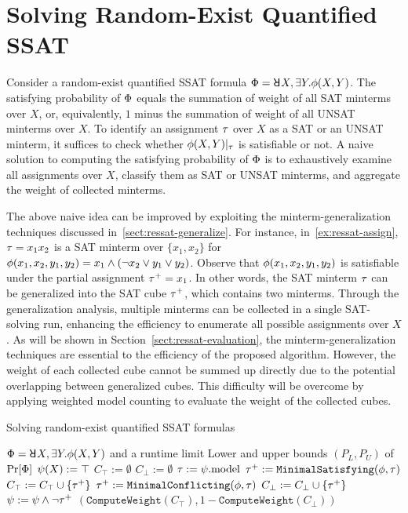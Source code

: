 \section{Solving Random-Exist Quantified SSAT}
\label{sect:ressat-technique}

Consider a random-exist quantified SSAT formula $\Qf=\random{} X,\exists Y.\pf(X,Y)$.
The satisfying probability of $\Phi$ equals the summation of weight of all SAT minterms over $X$, or, equivalently,
$1$ minus the summation of weight of all UNSAT minterms over $X$.
To identify an assignment $\tau$ over $X$ as a SAT or an UNSAT minterm,
it suffices to check whether $\phi(X,Y)|_{\tau}$ is satisfiable or not.
A naive solution to computing the satisfying probability of $\Phi$ is to exhaustively examine all assignments over $X$, classify them as SAT or UNSAT minterms, and aggregate the weight of collected minterms.

The above naive idea can be improved by exploiting the minterm-generalization techniques discussed in~\cref{sect:ressat-generalize}.
For instance, in~\cref{ex:ressat-assign},
$\tau=x_1x_2$ is a SAT minterm over $\{x_1,x_2\}$ for $\phi(x_1,x_2,y_1,y_2)=x_1 \land (\lnot x_2 \lor y_1 \lor y_2)$.
Observe that $\phi(x_1,x_2,y_1,y_2)$ is satisfiable under the partial assignment $\tau^+=x_1$.
In other words, the SAT minterm $\tau$ can be generalized into the SAT cube $\tau^+$, which contains two minterms.
Through the generalization analysis, multiple minterms can be collected in a single SAT-solving run,
enhancing the efficiency to enumerate all possible assignments over $X$.
As will be shown in Section~\ref{sect:ressat-evaluation},
the minterm-generalization techniques are essential to the efficiency of the proposed algorithm.
However, the weight of each collected cube cannot be summed up directly due to the potential overlapping between generalized cubes.
This difficulty will be overcome by applying weighted model counting to evaluate the weight of the collected cubes.

\begin{algorithm}[p]
    \caption{Solving random-exist quantified SSAT formulas}
    \label{alg:ressat}
    \begin{algorithmic}[1]
        \REQUIRE
        $\Qf=\random{} X,\exists Y.\pf(X,Y)$ and a runtime limit \timeout
        \ENSURE
        Lower and upper bounds $(P_L,P_U)$ of $\Pr[\Phi]$
        \STATE $\psi(X) := \top$
        \STATE $C_\top := \emptyset$
        \STATE $C_\bot := \emptyset$
        \STATE $\tau := \psi.\mathrm{model}$
        \IF{($\sat{\pcf{\pf}{\as}}$)}
        \STATE $\tau^+ := \texttt{MinimalSatisfying}(\phi,\tau)$
        \STATE $C_\top := C_\top \cup \{\tau^+\}$
        \ELSE
        \STATE $\tau^+ := \texttt{MinimalConflicting}(\phi,\tau)$
        \STATE $C_\bot := C_\bot \cup \{\tau^+\}$
        \ENDIF
        \STATE $\psi := \psi \land \lnot\tau^+$
        \ENDWHILE
        \RETURN $(\texttt{ComputeWeight}(C_\top),1-\texttt{ComputeWeight}(C_\bot))$
    \end{algorithmic}
\end{algorithm}

